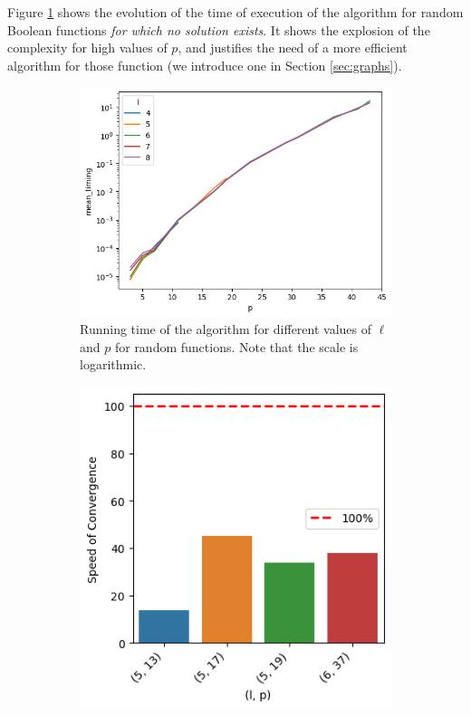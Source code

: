 Figure \ref{fig:lineplot_timings} shows the evolution of the time of execution of the algorithm for random Boolean functions \emph{for which no solution exists}.  It shows the explosion of the complexity for high values of
$p$, and justifies the need of a more efficient algorithm for those function (we introduce one in Section \ref{sec:graphs}).  



\begin{figure}
    \centering
    \begin{subfigure}{0.55\textwidth}
        \centering
        \includegraphics[width=\linewidth]{images/lineplot_timings.png}
        \caption{Running time of the algorithm for different values of $\ell$ and $p$ for random functions. Note that the scale is logarithmic.}        
        \label{fig:lineplot_timings}
        \end{subfigure}\hspace{0.04\textwidth}
    \begin{subfigure}{0.35\textwidth}
        \centering
        \includegraphics[width=\linewidth]{images/barplot.png}

\end{subfigure}
\end{figure}
